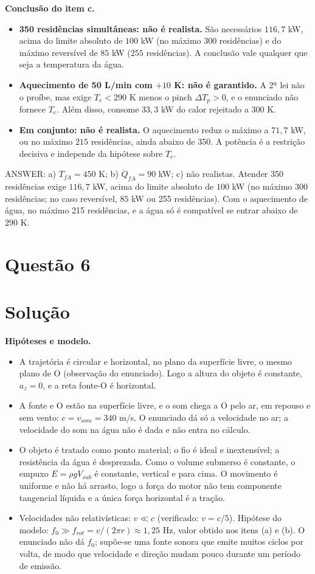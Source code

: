 \documentclass{article}%
\begin{document}
\textbf{Conclusão do item c.}
\begin{itemize}
\item \textbf{350 residências simultâneas: não é realista.} São necessários $116{,}7$ kW, acima do limite absoluto de $100$ kW (no máximo $300$ residências) e do máximo reversível de $85$ kW ($255$ residências). A conclusão vale qualquer que seja a temperatura da água.
\item \textbf{Aquecimento de 50 L/min com $+10$ K: não é garantido.} A 2ª lei não o proíbe, mas exige $T_e<290$ K menos o pinch $\Delta T_p>0$, e o enunciado não fornece $T_e$. Além disso, consome $33{,}3$ kW do calor rejeitado a 300 K.
\item \textbf{Em conjunto: não é realista.} O aquecimento reduz o máximo a $71{,}7$ kW, ou no máximo $215$ residências, ainda abaixo de 350. A potência é a restrição decisiva e independe da hipótese sobre $T_e$.
\end{itemize}

ANSWER: a) $T_{fA}=450$ K; b) $\dot Q_{fA}=90$ kW; c) não realistas. Atender 350 residências exige $116{,}7$ kW, acima do limite absoluto de $100$ kW (no máximo 300 residências; no caso reversível, $85$ kW ou 255 residências). Com o aquecimento de água, no máximo 215 residências, e a água só é compatível se entrar abaixo de 290 K.%
\newpage%
\section*{Questão 6}

\section*{Solução}

\textbf{Hipóteses e modelo.}
\begin{itemize}
\item A trajetória é circular e horizontal, no plano da superfície livre, o mesmo plano de O (observação do enunciado). Logo a altura do objeto é constante, $a_z=0$, e a reta fonte-O é horizontal.
\item A fonte e O estão na superfície livre, e o som chega a O pelo ar, em repouso e sem vento: $c=v_{som}=340$ m/s. O enunciado dá só a velocidade no ar; a velocidade do som na água não é dada e não entra no cálculo.
\item O objeto é tratado como ponto material; o fio é ideal e inextensível; a resistência da água é desprezada. Como o volume submerso é constante, o empuxo $E=\rho g V_{sub}$ é constante, vertical e para cima. O movimento é uniforme e não há arrasto, logo a força do motor não tem componente tangencial líquida e a única força horizontal é a tração.
\item Velocidades não relativísticas: $v\ll c$ (verificado: $v=c/5$). Hipótese do modelo: $f_0\gg f_{rot}=v/(2\pi r)\approx 1{,}25$ Hz, valor obtido nos itens (a) e (b). O enunciado não dá $f_0$; supõe-se uma fonte sonora que emite muitos ciclos por volta, de modo que velocidade e direção mudam pouco durante um período de emissão.
\end{itemize}
\end{document}
